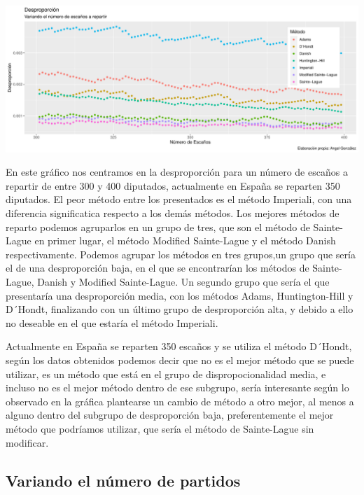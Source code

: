 \documentclass[12pt,a4paper,]{book}
\numberwithin{dummy}{section}
\theoremstyle{ocrenumbox}
\theoremstyle{blacknumex}
\theoremstyle{blacknumbox}
\theoremstyle{ocrenum}
\theoremstyle{ocrenum}
\begin{document}
\begin{center}\includegraphics[width=0.95\linewidth]{figurasR/unnamed-chunk-43-1} \end{center}

En este gráfico nos centramos en la desproporción para un número de
escaños a repartir de entre 300 y 400 diputados, actualmente en España
se reparten 350 diputados. El peor método entre los presentados es el
método Imperiali, con una diferencia significatica respecto a los demás
métodos. Los mejores métodos de reparto podemos agruparlos en un grupo
de tres, que son el método de Sainte-Lague en primer lugar, el método
Modified Sainte-Lague y el método Danish respectivamente. Podemos
agrupar los métodos en tres grupos,un grupo que sería el de una
desproporción baja, en el que se encontrarían los métodos de
Sainte-Lague, Danish y Modified Sainte-Lague. Un segundo grupo que sería
el que presentaría una desproporción media, con los métodos Adams,
Huntington-Hill y D´Hondt, finalizando con un último grupo de
desproporción alta, y debido a ello no deseable en el que estaría el
método Imperiali.

Actualmente en España se reparten 350 escaños y se utiliza el método
D´Hondt, según los datos obtenidos podemos decir que no es el mejor
método que se puede utilizar, es un método que está en el grupo de
dispropocionalidad media, e incluso no es el mejor método dentro de ese
subgrupo, sería interesante según lo observado en la gráfica plantearse
un cambio de método a otro mejor, al menos a alguno dentro del subgrupo
de desproporción baja, preferentemente el mejor método que podríamos
utilizar, que sería el método de Sainte-Lague sin modificar.

\hypertarget{variando-el-nuxfamero-de-partidos}{%
\subsection{Variando el número de
partidos}\label{variando-el-nuxfamero-de-partidos}}
\end{document}
